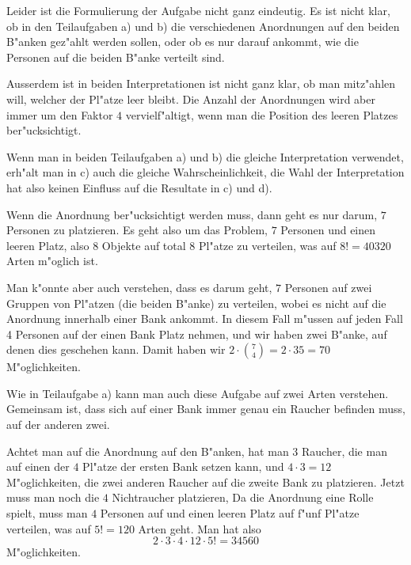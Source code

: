 \begin{loesung}
Leider ist die Formulierung der Aufgabe nicht ganz eindeutig.
Es ist nicht klar, ob in den Teilaufgaben a) und b) die verschiedenen
Anordnungen auf den beiden B"anken gez"ahlt werden sollen, oder ob es
nur darauf ankommt, wie die Personen auf die beiden B"anke verteilt
sind.

Ausserdem ist in beiden Interpretationen ist nicht ganz klar, ob man mitz"ahlen
will, welcher der Pl"atze leer bleibt.
Die Anzahl der Anordnungen wird aber immer um den Faktor $4$ 
vervielf"altigt, wenn man die Position des leeren Platzes ber"ucksichtigt.

Wenn man in beiden Teilaufgaben a) und b) die gleiche Interpretation verwendet,
erh"alt man in c) auch die gleiche Wahrscheinlichkeit, die Wahl der
Interpretation hat also keinen Einfluss auf die Resultate in c) und d).
\begin{teilaufgaben}
\item
Wenn die Anordnung ber"ucksichtigt werden muss, dann geht es nur
darum, $7$ Personen zu platzieren.
Es geht also um das Problem, $7$ Personen und einen leeren Platz,
also $8$ Objekte auf total $8$ Pl"atze zu verteilen, was auf 
$8!=40320$ Arten m"oglich ist.

Man k"onnte aber auch verstehen, dass es darum geht, $7$ Personen
auf zwei Gruppen von Pl"atzen (die beiden B"anke) zu verteilen,
wobei es nicht auf die Anordnung innerhalb einer Bank ankommt.
In diesem Fall
m"ussen auf jeden Fall 4 Personen auf der einen Bank Platz nehmen,
und wir haben zwei B"anke, auf denen dies geschehen kann. 
Damit haben wir $2\cdot\binom{7}{4}=2\cdot 35=70$ M"oglichkeiten.

\item
Wie in Teilaufgabe a) kann man auch diese Aufgabe auf zwei Arten verstehen.
Gemeinsam ist, dass sich auf einer Bank immer genau ein Raucher befinden
muss, auf der anderen zwei.

Achtet man auf die Anordnung auf den B"anken,
hat man $3$ Raucher, die man auf einen der $4$ Pl"atze der ersten Bank setzen
kann, und $4\cdot 3=12$ M"oglichkeiten, die zwei anderen Raucher auf die
zweite Bank zu platzieren.
Jetzt muss man noch die $4$ Nichtraucher platzieren,
Da die Anordnung eine Rolle spielt, muss man $4$ Personen auf und
einen leeren Platz auf f"unf Pl"atze verteilen, was auf $5!=120$
Arten geht.
Man hat also
\[
2\cdot 3\cdot 4\cdot 12\cdot 5!=34560
\]
M"oglichkeiten.


\end{teilaufgaben}
\end{loesung}
